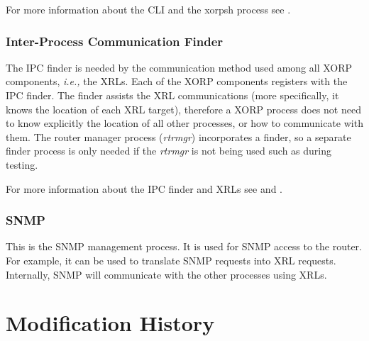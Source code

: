 \documentclass[11pt]{article}
\newcommand{\ie}{\emph{i.e.,}\xspace}
\begin{document}
For more information about the CLI and the xorpsh process see
\cite{xorp:rtrmgr}.

\subsubsection{Inter-Process Communication Finder}

The IPC finder is needed by the communication method used among all
XORP components, \ie the XRLs. Each of the XORP components registers
with the IPC finder. The finder assists the XRL communications (more
specifically, it knows the location of each XRL target), therefore a
XORP process does not need to know explicitly the location of all
other processes, or how to communicate with them.  The router manager
process ({\em rtrmgr}) incorporates a finder, so a separate finder process
is only needed if the {\em rtrmgr} is not being used such as during testing.

For more information about the IPC finder and XRLs see
\cite{xorp:xrl} and \cite{xorp:xrl_interfaces}.

\subsubsection{SNMP}

This is the SNMP management process. It is used for SNMP access to the
router. For example, it can be used to translate SNMP requests into XRL
requests. Internally, SNMP will communicate with the other processes
using XRLs.


\appendix
\section{Modification History}
\end{document}
